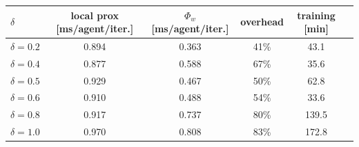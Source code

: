 
\begin{tabular}{lccccc}
\toprule
$\delta$ & local prox [ms/agent/iter.] & $\Phi_w$ [ms/agent/iter.] & overhead & training [min] \\
\midrule
$\delta=0.2$ & 0.894 & 0.363 & 41\% & 43.1 \\
$\delta=0.4$ & 0.877 & 0.588 & 67\% & 35.6 \\
$\delta=0.5$ & 0.929 & 0.467 & 50\% & 62.8 \\
$\delta=0.6$ & 0.910 & 0.488 & 54\% & 33.6 \\
$\delta=0.8$ & 0.917 & 0.737 & 80\% & 139.5 \\
$\delta=1.0$ & 0.970 & 0.808 & 83\% & 172.8 \\
\bottomrule
\end{tabular}
